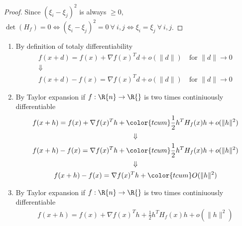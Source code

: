 \documentclass{article}
\begin{document}
\begin{tasks}
\begin{enumerate}
\begin{proof}
                    Since \((\xi_i-\xi_j)^2\) is always \(\ge 0\), \(\det(H_f) = 0 \Longleftrightarrow (\xi_i-\xi_j)^2 = 0\ \forall\ i,j \Longleftrightarrow \xi_i = \xi_j\ \forall\ i,j\).
                  \end{proof}
                \end{enumerate}
        \item \begin{enumerate}
            \item By definition of totaly differentiability
                  \begin{displaymath}
                    \begin{gathered}
                        f(x + d) = f(x) + \nabla f(x)^T d + o(\|d\|) \quad \text{for } \|d\| \to 0 \\ 
                        \Downarrow \\
                        f(x + d) - f(x) = \nabla f(x)^T d + o(\|d\|) \quad \text{for } \|d\| \to 0
                    \end{gathered}
                  \end{displaymath}
            \item By Taylor expansion if \(f: \R{n} \to \R{}\) is two times continiuously 
                  differentiable 
                  \begin{displaymath}
                    \begin{gathered}
                        f(x + h) = f(x) + \nabla f(x)^T h + {\color{tcum}\frac{1}{2}h^T H_f(x)h + o(\|h\|^2)} \\
                        \Downarrow \\
                        f(x + h) - f(x) = \nabla f(x)^T h + {\color{tcum}\frac{1}{2}h^T H_f(x)h + o(\|h\|^2)} \\
                        \Downarrow \\
                        f(x + h) - f(x) = \nabla f(x)^T h + {\color{tcum}O(\|h\|^2)} \\
                    \end{gathered}
                  \end{displaymath}
            \item By Taylor expansion if \(f: \R{n} \to \R{}\) is two times continiuously 
                  differentiable 
                  \begin{displaymath}
                    \begin{gathered}
                        f(x + h) = f(x) + \nabla f(x)^T h + \frac{1}{2}h^T H_f(x)h + o(\|h\|^2) \\

\end{gathered}
\end{displaymath}
\end{enumerate}
\end{tasks}
\end{document}
